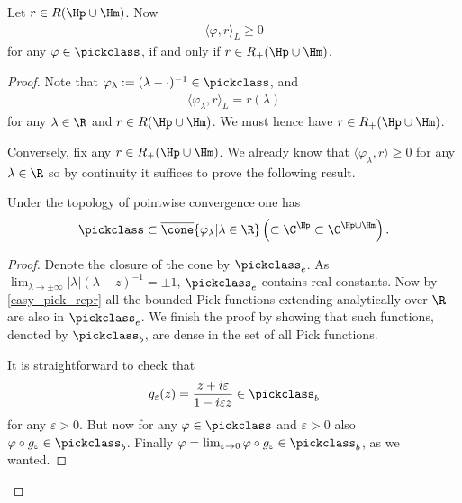 \begin{lause}\label{pick_functionals}
	Let $r \in R(\Hp \cup \Hm)$. Now
	\begin{align*}
		\langle \varphi, r \rangle_{L} \geq 0
	\end{align*}
	for any $\varphi \in \pickclass$, if and only if $r \in R_{+}(\Hp \cup \Hm)$.
\end{lause}
\begin{proof}
	Note that $\varphi_{\lambda} := (\lambda - \cdot)^{-1} \in \pickclass$, and
	\begin{align*}
		\langle \varphi_{\lambda}, r \rangle_{L} = r(\lambda)
	\end{align*}
	for any $\lambda \in \R$ and $r \in R(\Hp \cup \Hm)$. We must hence have $r \in R_{+}(\Hp \cup \Hm)$.

	Conversely, fix any $r \in R_{+}(\Hp \cup \Hm)$. We already know that $\langle \varphi_{\lambda}, r\rangle \geq 0$ for any $\lambda \in \R$ so by continuity it suffices to prove the following result.

	\begin{lem}\label{pick_dense}
		Under the topology of pointwise convergence one has
		\begin{align*}
			\pickclass \subset \overline{\cone}\{\varphi_{\lambda} | \lambda \in \R\} \left(\subset \C^{\Hp} \subset \C^{\Hp \cup \Hm}\right).
		\end{align*}
	\end{lem}
	\begin{proof}
		Denote the closure of the cone by $\pickclass_{e}$. As $\lim_{\lambda \to \pm \infty}|\lambda|(\lambda - z)^{-1} = \pm 1$, $\pickclass_{e}$ contains real constants. Now by \ref{easy_pick_repr} all the bounded Pick functions extending analytically over $\R$ are also in $\pickclass_{e}$. We finish the proof by showing that such functions, denoted by $\pickclass_{b}$, are dense in the set of all Pick functions.

		It is straightforward to check that
		\begin{align*}
			g_{\varepsilon}(z) = \frac{z + i \varepsilon}{1 - i \varepsilon z} \in \pickclass_{b}
		\end{align*}
		for any $\varepsilon > 0$. But now for any $\varphi \in \pickclass$ and $\varepsilon > 0$ also $\varphi \circ g_{\varepsilon} \in \pickclass_{b}$. Finally $\varphi = \lim_{\varepsilon \to 0} \varphi \circ g_{\varepsilon} \in \pickclass_{b}$, as we wanted.
	\end{proof}
\end{proof}

